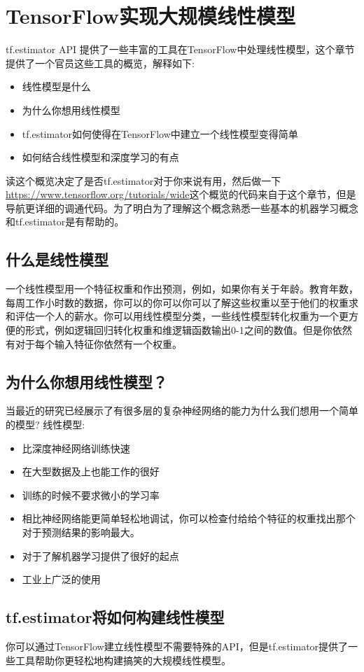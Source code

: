 \section{TensorFlow实现大规模线性模型}
tf.estimator API 提供了一些丰富的工具在TensorFlow中处理线性模型，这个章节提供了一个官员这些工具的概览，解释如下:
\begin{itemize}
  \item 线性模型是什么
  \item 为什么你想用线性模型
  \item tf.estimator如何使得在TensorFlow中建立一个线性模型变得简单
  \item 如何结合线性模型和深度学习的有点
\end{itemize}
读这个概览决定了是否tf.estimator对于你来说有用，然后做一下\href{Models tutorial}{https://www.tensorflow.org/tutorials/wide}这个概览的代码来自于这个章节，但是导航更详细的调通代码。为了明白为了理解这个概念熟悉一些基本的机器学习概念和tf.estimator是有帮助的。
\subsection{什么是线性模型}
一个线性模型用一个特征权重和作出预测，例如，如果你有关于年龄。教育年数，每周工作小时数的数据，你可以的你可以你可以了解这些权重以至于他们的权重求和评估一个人的薪水。你可以用线性模型分类，一些线性模型转化权重为一个更方便的形式，例如逻辑回归转化权重和维逻辑函数输出0-1之间的数值。但是你依然有对于每个输入特征你依然有一个权重。
\subsection{为什么你想用线性模型？}
当最近的研究已经展示了有很多层的复杂神经网络的能力为什么我们想用一个简单的模型?\newline
线性模型:
\begin{itemize}
  \item 比深度神经网络训练快速
  \item 在大型数据及上也能工作的很好
  \item 训练的时候不要求微小的学习率
  \item 相比神经网络能更简单轻松地调试，你可以检查付给给个特征的权重找出那个对于预测结果的影响最大。
  \item 对于了解机器学习提供了很好的起点
  \item 工业上广泛的使用
\end{itemize}
\subsection{tf.estimator将如何构建线性模型}
你可以通过TensorFlow建立线性模型不需要特殊的API，但是tf.estimator提供了一些工具帮助你更轻松地构建搞笑的大规模线性模型。
